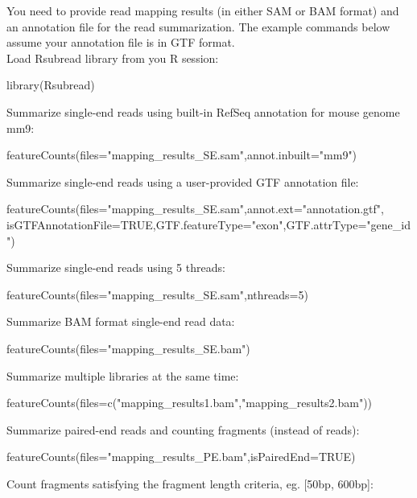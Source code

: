 \documentclass[12pt]{report}
\newcommand{\Rsubread}{\textsf{Rsubread}}
\newcommand{\R}{\textsf{R}}
\begin{document}
You need to provide read mapping results (in either SAM or BAM format) and an annotation file for the read summarization.
The example commands below assume your annotation file is in GTF format.\\

\noindent Load {\Rsubread} library from you {\R} session:

\begin{Rcode}
library(Rsubread)
\end{Rcode}

\noindent Summarize single-end reads using built-in RefSeq annotation for mouse genome mm9:
\begin{Rcode}
featureCounts(files="mapping_results_SE.sam",annot.inbuilt="mm9")
\end{Rcode}

\noindent Summarize single-end reads using a user-provided GTF annotation file:

\begin{Rcode}
featureCounts(files="mapping_results_SE.sam",annot.ext="annotation.gtf",
isGTFAnnotationFile=TRUE,GTF.featureType="exon",GTF.attrType="gene_id")
\end{Rcode}

\noindent Summarize single-end reads using 5 threads:

\begin{Rcode}
featureCounts(files="mapping_results_SE.sam",nthreads=5)
\end{Rcode}

\noindent Summarize BAM format single-end read data:

\begin{Rcode}
featureCounts(files="mapping_results_SE.bam")
\end{Rcode}

\noindent Summarize multiple libraries at the same time:

\begin{Rcode}
featureCounts(files=c("mapping_results1.bam","mapping_results2.bam"))
\end{Rcode}

\noindent Summarize paired-end reads and counting fragments (instead of reads):

\begin{Rcode}
featureCounts(files="mapping_results_PE.bam",isPairedEnd=TRUE)
\end{Rcode}

\noindent Count fragments satisfying the fragment length criteria, eg. [50bp, 600bp]:
\end{document}
